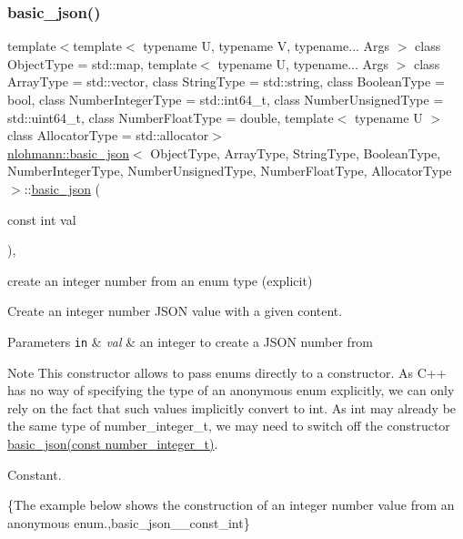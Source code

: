\subsubsection{\texorpdfstring{basic\+\_\+json()}{basic\_json()}\hspace{0.1cm}{\footnotesize\ttfamily [12/23]}}
{\footnotesize\ttfamily template$<$template$<$ typename U, typename V, typename... Args $>$ class Object\+Type = std\+::map, template$<$ typename U, typename... Args $>$ class Array\+Type = std\+::vector, class String\+Type  = std\+::string, class Boolean\+Type  = bool, class Number\+Integer\+Type  = std\+::int64\+\_\+t, class Number\+Unsigned\+Type  = std\+::uint64\+\_\+t, class Number\+Float\+Type  = double, template$<$ typename U $>$ class Allocator\+Type = std\+::allocator$>$ \\
\hyperlink{classnlohmann_1_1basic__json}{nlohmann\+::basic\+\_\+json}$<$ Object\+Type, Array\+Type, String\+Type, Boolean\+Type, Number\+Integer\+Type, Number\+Unsigned\+Type, Number\+Float\+Type, Allocator\+Type $>$\+::\hyperlink{classnlohmann_1_1basic__json}{basic\+\_\+json} (\begin{DoxyParamCaption}\item[{const int}]{val }\end{DoxyParamCaption})\hspace{0.3cm}{\ttfamily [inline]}, {\ttfamily [noexcept]}}



create an integer number from an enum type (explicit) 

Create an integer number J\+S\+ON value with a given content.


\begin{DoxyParams}[1]{Parameters}
\mbox{\tt in}  & {\em val} & an integer to create a J\+S\+ON number from\\
\hline
\end{DoxyParams}
\begin{DoxyNote}{Note}
This constructor allows to pass enums directly to a constructor. As C++ has no way of specifying the type of an anonymous enum explicitly, we can only rely on the fact that such values implicitly convert to int. As int may already be the same type of number\+\_\+integer\+\_\+t, we may need to switch off the constructor \hyperlink{classnlohmann_1_1basic__json_a0d838bc7ffca6017f51167e0a8ffd9b6}{basic\+\_\+json(const number\+\_\+integer\+\_\+t)}.
\end{DoxyNote}
Constant.

\{The example below shows the construction of an integer number value from an anonymous enum.,basic\+\_\+json\+\_\+\+\_\+const\+\_\+int\}

